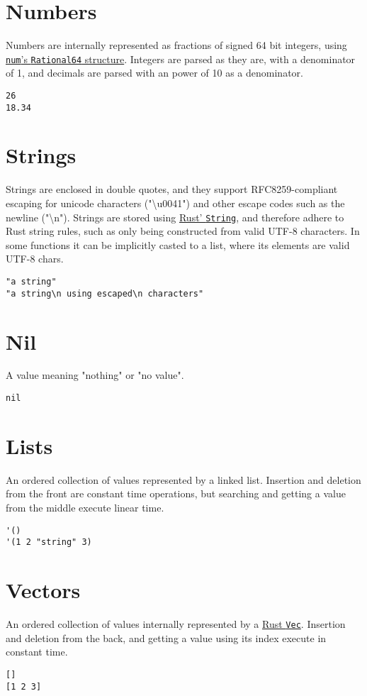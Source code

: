 \documentclass[11pt]{scrreprt}
\begin{document}
\section{Numbers}
Numbers are internally represented as fractions of signed 64 bit integers, using \href{https://docs.rs/num/0.4.0/num/rational/type.Rational64.html}{\texttt{num}'s \texttt{Rational64} structure}. Integers are parsed as they are, with a denominator of 1, and decimals are parsed with an power of 10 as a denominator.
\begin{verbatim}
26
18.34
\end{verbatim}

\section{Strings}
Strings are enclosed in double quotes, and they support RFC8259-compliant escaping for unicode characters ("\textbackslash u0041") and other escape codes such as the newline ("\textbackslash n"). Strings are stored using \href{https://doc.rust-lang.org/stable/std/string/struct.String.html}{Rust' \texttt{String}}, and therefore adhere to Rust string rules, such as only being constructed from valid UTF-8 characters. In some functions it can be implicitly casted to a list, where its elements are valid UTF-8 chars.
\begin{verbatim}
"a string"
"a string\n using escaped\n characters"
\end{verbatim}

\section{Nil}
A value meaning "nothing" or "no value".
\begin{verbatim}
nil
\end{verbatim}

\section{Lists}
An ordered collection of values represented by a linked list. Insertion and deletion from the front are constant time operations, but searching and getting a value from the middle execute linear time.
\begin{verbatim}
'()
'(1 2 "string" 3)
\end{verbatim}

\section{Vectors}
An ordered collection of values internally represented by a \href{https://doc.rust-lang.org/std/vec/struct.Vec.html}{Rust \texttt{Vec}}. Insertion and deletion from the back, and getting a value using its index execute in constant time.
\begin{verbatim}
[]
[1 2 3]
\end{verbatim}
\end{document}
